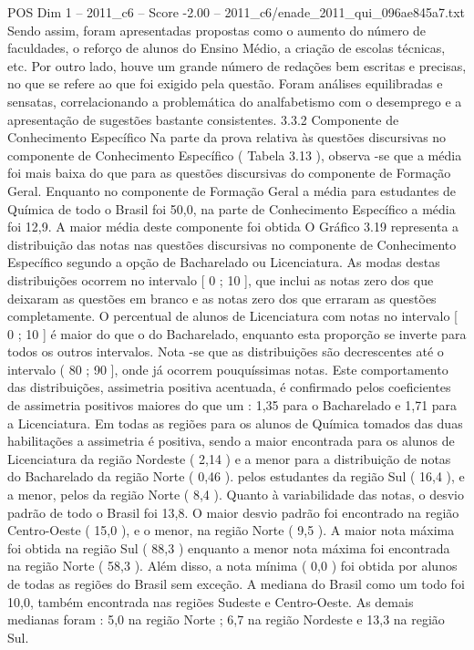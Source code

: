 \begin{textsample}{POS Dim 1 – 2011\_c6 – Score -2.00 – 2011\_c6/enade\_2011\_qui\_096ae845a7.txt}
Sendo assim, foram apresentadas propostas como o aumento do número de faculdades, o reforço de alunos do Ensino Médio, a criação de escolas técnicas, etc.
Por outro lado, houve um grande número de redações bem escritas e precisas, no que se refere ao que foi exigido pela questão.
Foram análises equilibradas e sensatas, correlacionando a problemática do analfabetismo com o desemprego e a apresentação de sugestões bastante consistentes. 3.3.2 Componente de Conhecimento Específico Na parte da prova relativa às questões discursivas no componente de Conhecimento Específico ( Tabela 3.13 ), observa -se que a média foi mais baixa do que para as questões discursivas do componente de Formação Geral.
Enquanto no componente de Formação Geral a média para estudantes de Química de todo o Brasil foi 50,0, na parte de Conhecimento Específico a média foi 12,9.
A maior média deste componente foi obtida O Gráfico 3.19 representa a distribuição das notas nas questões discursivas no componente de Conhecimento Específico segundo a opção de Bacharelado ou Licenciatura.
As modas destas distribuições ocorrem no intervalo [ 0 ; 10 ], que inclui as notas zero dos que deixaram as questões em branco e as notas zero dos que erraram as questões completamente.
O percentual de alunos de Licenciatura com notas no intervalo [ 0 ; 10 ] é maior do que o do Bacharelado, enquanto esta proporção se inverte para todos os outros intervalos.
Nota -se que as distribuições são decrescentes até o intervalo ( 80 ; 90 ], onde já ocorrem pouquíssimas notas.
Este comportamento das distribuições, assimetria positiva acentuada, é confirmado pelos coeficientes de assimetria positivos maiores do que um : 1,35 para o Bacharelado e 1,71 para a Licenciatura.
Em todas as regiões para os alunos de Química tomados das duas habilitações a assimetria é positiva, sendo a maior encontrada para os alunos de Licenciatura da região Nordeste ( 2,14 ) e a menor para a distribuição de notas do Bacharelado da região Norte ( 0,46 ). pelos estudantes da região Sul ( 16,4 ), e a menor, pelos da região Norte ( 8,4 ).
Quanto à variabilidade das notas, o desvio padrão de todo o Brasil foi 13,8.
O maior desvio padrão foi encontrado na região Centro-Oeste ( 15,0 ), e o menor, na região Norte ( 9,5 ).
A maior nota máxima foi obtida na região Sul ( 88,3 ) enquanto a menor nota máxima foi encontrada na região Norte ( 58,3 ).
Além disso, a nota mínima ( 0,0 ) foi obtida por alunos de todas as regiões do Brasil sem exceção.
A mediana do Brasil como um todo foi 10,0, também encontrada nas regiões Sudeste e Centro-Oeste.
As demais medianas foram : 5,0 na região Norte ; 6,7 na região Nordeste e 13,3 na região Sul.

\end{textsample}
